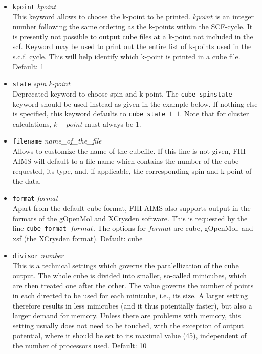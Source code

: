 \begin{itemize}
\item {} \texttt{kpoint} \textit{kpoint} \\
This keyword allows to choose the k-point to be printed. 
$kpoint$ is an integer number following the same ordering 
as the k-points within the SCF-cycle. It is presently not 
possible to output cube files at a k-point not included in the scf. 
Keyword   may be
used to print out the entire list of k-points used in the s.c.f. cycle.
This will help identify which k-point is printed in a cube file.
Default: 1

\item {} \texttt{state} \textit{spin} \textit{k-point} \\
Deprecated keyword to choose spin and k-point. 
The \texttt{cube spinstate} keyword 
should be used instead as given in the example below. 
If nothing else is specified, this keyword defaults to 
\texttt{cube state $1$ $1$}. Note that for cluster
calculations, $k-point$ must always be 1. 

\item {} \texttt{filename} \textit{name\_of\_the\_file} \\
Allows to customize the name of the cubefile. If this line is not given, FHI-AIMS
will default to a file name which contains the number of the cube requested, its
type, and, if applicable, the corresponding spin and k-point of the data. 

\item {} \texttt{format} \textit{format} \\
Apart from the default cube format, FHI-AIMS also supports output 
in the formats of the gOpenMol and XCrysden software. This is requested by the line
\texttt{cube format $format$}. The options for $format$ are cube,
gOpenMol, and xsf (the XCrysden format). Default: cube

\item {} \texttt{divisor} \textit{number} \\
This is a technical settings which governs the paralellization of the 
cube output. The whole cube is divided into smaller, so-called minicubes, 
which are then treated one after the other. The value governs the number of points in each 
directed to be used for each minicube, i.e., its size. A larger setting therefore results
in less minicubes (and it thus potentially faster), but also a larger demand for memory. 
Unless there are problems with memory, this setting usually does not
need to be touched, with the exception of output potential, where it
should be set to its maximal value (45), independent of the number of
processors used. Default: 10 


\end{itemize}
